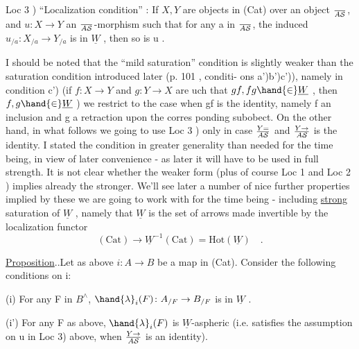 
Loc 3 ) ``Localization condition'' : If $X,Y$ are objects in (Cat) over
an object $\over{A}{\mathcal{S}}$, and $u\colon X\to Y$ an $\over{A}{\mathcal{S}}$-morphism such that for any a in
$\over{A}{\mathcal{S}}$, the induced $u_{/a} : X_{/a}\to Y_{/a}$ is in $\underline{W}$ , then so is u .

I should be noted that the ``mild saturation'' condition is slightly
weaker than the saturation condition introduced later (p. 101 , conditi-%
ons a')b')c')), namely in condition c') (if $f\colon X\to Y$ and $g\colon Y\to X$ are
uch that $gf,fg \hand{\in} \underline{W}$ , then $f,g \hand{\in} \underline{W}$ ) we restrict to the case when gf is
the identity, namely  f an inclusion and g a retraction upon the corres%
ponding subobect. On the other hand, in what follows we  going to
use Loc 3 ) only in case $Y=\over{A}{\mathcal{S}}$ and  $Y\to \over{A}{\mathcal{S}}$ is the identity. I stated
the condition in greater generality than needed for the time being,
in view of later convenience - as later it will have to be used in full
strength. It is not clear whether the weaker form  (plus of course Loc 1
and Loc 2 ) implies already the stronger. We'll see later a number of
nice further properties  implied by these we are going to work with for
the time being - including \uline{strong} saturation of $\underline{W}$ , namely that $\underline{W}$ is
the set of arrows made invertible by the localization functor
\[ (\mathrm{Cat}) \longrightarrow \underline{W}^{-1}(\mathrm{Cat}) = \mathrm{Hot}(\underline{W}) \quad . \]

\uline{Proposition}..Let as above $i\colon A\to B$ be a map in (Cat). Consider the
following conditions on i:

(i) For any F in $B^{\wedge}$, $\hand{\lambda}_i(F)\colon A_{/F} \to B_{/F}$ is in $\underline{W}$ .

(i') For any F as above, $\hand{\lambda}_i(F)$ is $\underline{W}$-aspheric (i.e. satisfies the
assumption on u in Loc 3) above, when $Y\to\over{A}{\mathcal{S}}$ is an identity).

